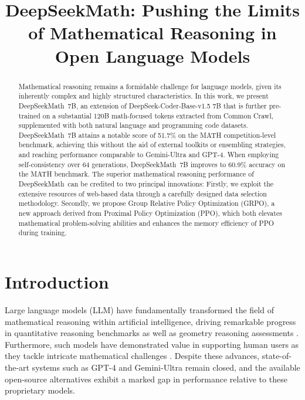 \title{DeepSeekMath: Pushing the Limits of Mathematical Reasoning in Open Language Models}

\begin{abstract}
Mathematical reasoning remains a formidable challenge for language models, given its inherently complex and highly structured characteristics. In this work, we present DeepSeekMath~7B, an extension of DeepSeek-Coder-Base-v1.5 7B that is further pre-trained on a substantial 120B math-focused tokens extracted from Common Crawl, supplemented with both natural language and programming code datasets. DeepSeekMath~7B attains a notable score of 51.7\% on the MATH competition-level benchmark, achieving this without the aid of external toolkits or ensembling strategies, and reaching performance comparable to Gemini-Ultra and GPT-4. When employing self-consistency over 64 generations, DeepSeekMath~7B improves to 60.9\% accuracy on the MATH benchmark. The superior mathematical reasoning performance of DeepSeekMath~can be credited to two principal innovations: Firstly, we exploit the extensive resources of web-based data through a carefully designed data selection methodology. Secondly, we propose Group Relative Policy Optimization (GRPO), a new approach derived from Proximal Policy Optimization (PPO), which both elevates mathematical problem-solving abilities and enhances the memory efficiency of PPO during training.
\end{abstract}

\section{Introduction}

Large language models (LLM) have fundamentally transformed the field of mathematical reasoning within artificial intelligence, driving remarkable progress in quantitative reasoning benchmarks \citep{MATH} as well as geometry reasoning assessments \citep{trinh2024solving}. Furthermore, such models have demonstrated value in supporting human users as they tackle intricate mathematical challenges \citep{tao}. Despite these advances, state-of-the-art systems such as GPT-4 \citep{gpt4} and Gemini-Ultra \citep{gemini} remain closed, and the available open-source alternatives exhibit a marked gap in performance relative to these proprietary models.

